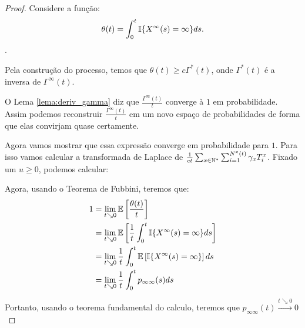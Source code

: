 \begin{proof}
  Considere a função:
  \begin{displaymath}
    \theta(t) = \int_0^t {\mathbb{I}} \{ X^\infty (s) = \infty \} ds.
  \end{displaymath}.
  
  Pela construção do processo, temos que $\theta(t) \geq c
  \Gamma^*(t)$, onde $\Gamma^*(t)$ é a inversa de $\Gamma^\infty(t)$.

  O Lema \ref{lema:deriv_gamma} diz que $\frac{\Gamma^\infty(t)}{t}$
  converge à $1$ em probabilidade. Assim podemos reconstruir
  $\frac{\Gamma^\infty(t)}{t}$ em um novo espaço de probabilidades de
  forma que elas convirjam quase certamente.

  Agora vamos mostrar que essa expressão converge em probabilidade
  para $1$. Para isso vamos calcular a transformada de Laplace de
  $\frac{1}{ct} \sum_{x \in {\mathbb{N^*}}} \sum_{i = 1}^{N^x(t)} \gamma_x
  T^x_i$. Fixado um $u \geq 0$, podemos calcular:





  Agora, usando o Teorema de Fubbini, teremos que:
  \begin{align*}
    1 &= \lim_{t \searrow 0} {\mathbb{E}} \left[ \frac{\theta(t)}{t} \right] \\ 
    &= \lim_{t \searrow 0} {\mathbb{E}}\left[
      \frac{1}{t} \int_0^t {\mathbb{I}}\{ X^\infty(s) = \infty \} ds
    \right] \\
    &= \lim_{t \searrow 0} 
      \frac{1}{t} \int_0^t {\mathbb{E}}\left[ {\mathbb{I}}\{ X^\infty(s) = \infty \}\right] ds
    \\
    &= \lim_{t \searrow 0} \frac{1}{t} \int_0^t p_{\infty \infty} (s) ds
  \end{align*}

  Portanto, usando o teorema fundamental do calculo, teremos que
  $p_{\infty \infty} (t) \xrightarrow{t \searrow 0} 0$


\end{proof}

